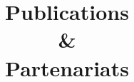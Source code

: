 \documentclass[french, 11pt]{dibiso/pubpart}
\title{Publications \\ \& \\ Partenariats}
\date{\reportyear}
\subtitle{\textbf{\entitiesacronym} \\
  \medskip
  \entitiesfullname
}
\begin{document}
\maketitle


\nocite{*} %

{
  \footnotesize
  \printbibliography
}

\medskip


\makelastpagebiblio
 
\end{document}
